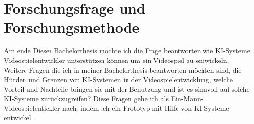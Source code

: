 \begin{comment}
	Im Jahr 2022 hat die Firma OpenAI sein KI-Werkzeug ChatGPT der Öffentlichkeit zugänglich gemacht, und viele Berichte über einen Meilenstein in der KI-Forschung.
	\\
	ChatGPT kann selbständig durch eine für den Menschen einfache Prompt Schulaufgaben lösen oder sich mit dem Benutzer unterhalten.
	\\
	ChatGPT kann ganze Programme in verschiedenen Programmiersprachen Schreiben, was es davor nie in solchen Umfang da gewesen war.
	\\
	KI-Systeme bieten ein neues Gebiet um Forschung und Experimente zu betreiben, und ich möchte in meiner Bachelorthesis herausfinden ob es möglich ist, ein Videospiel mit hilfe von KI-Systemen zu entwickeln, so wie in der Pionierzeit wo einzelne Entwickler ganze Projekte erschaffen haben.
	\\ 
	Die Systeme, auf denen Videospiele liefen, wurden immer leistungsfähiger, und somit wurden auch lebendigere und komplexere Welten möglich. Videospiele wurden in der Regel nicht mehr von einer Person entwickelt, sondern von ganzen Studios. In diesen Studios werden Aufgaben auf Teams verteilt, wie zum Beispiel Concept Art and Design, Musik und Soundeffekte bis hin zum Vertrieb und Marketing.
	\\
	Kurz, ein Videospiel zu entwickeln ist schon sehr lange keine Ein-Mann-Aufgabe mehr, Und in solchen Teams kann jeder Videospielentwickler sich auf seine Stärken im Team konzentrieren.
	\\
	Ich sehe seit 2022 eine neue Möglichkeit Videospiele zu entwickeln, die zuvor in diesem Umfang nicht möglich gewesen war.
	\\
	KI-Systeme sind Werkzeuge, die ein hohes Potenzial beinhalten, um schnelles und qualitatives Arbeiten mit sich bringen.
	\\
	Mit Midjourney kann ich innerhalb von wenigen Minuten eine Landschaft erstellen lassen. ChatGPT kann dir Geschichten schreiben und Voice.ai dir eine neue Stimme verleihen. Das was die vorhin drei genannten KI-Systeme sich spezialisiert haben, sind in der realen
	Welt, echte Berufe in der Gamingbranche - Concept Artist, narrative Designer / video game writer, voice actor.
	\\
	Es ist heute theoretisch möglich, ohne viele Vorkenntnisse diese Aufgaben mit Hilfe von KI-Systemen zu übernehmen.
	Inhalt...
\end{comment}
\section{Forschungsfrage und Forschungsmethode}
Am ende Dieser Bachelorthesis möchte ich die Frage beantworten wie KI-Systeme Videospielentwickler unterstützen können um ein Videospiel zu entwickeln.
Weitere Fragen die ich in meiner Bachelorthesis beantworten möchten sind, die Hürden und Grenzen von KI-Systemen in der Videospielentwicklung, welche Vorteil und Nachteile bringen sie mit der Benutzung und ist es sinnvoll auf solche KI-Systeme zurückzugreifen?
Diese Fragen gehe ich als Ein-Mann-Videospielentickler nach, indem ich ein Prototyp mit Hilfe von KI-Systeme entwickel.
